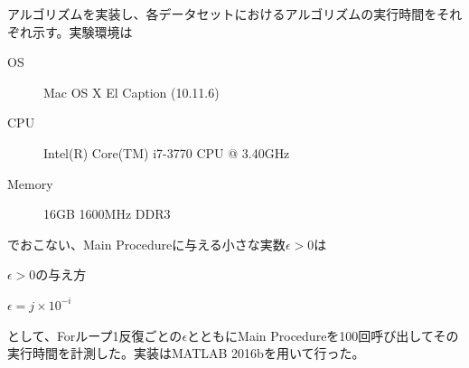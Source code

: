 アルゴリズムを実装し、各データセットにおけるアルゴリズムの実行時間をそれぞれ示す。実験環境は
\begin{description}
  \item[OS] Mac OS X El Caption (10.11.6)
  \item[CPU] Intel(R) Core(TM) i7-3770 CPU @ 3.40GHz
  \item[Memory] 16GB 1600MHz DDR3
\end{description}
でおこない、Main Procedureに与える小さな実数$\epsilon > 0$は
\begin{algorithm}
  \caption{$\epsilon > 0$の与え方}
  \begin{algorithmic}
        \State $\epsilon = j \times 10^{-i}$
      \EndFor
    \EndFor
  \end{algorithmic}
\end{algorithm}
として、Forループ1反復ごとの$\epsilon$とともにMain Procedureを100回呼び出してその実行時間を計測した。実装はMATLAB 2016bを用いて行った。

